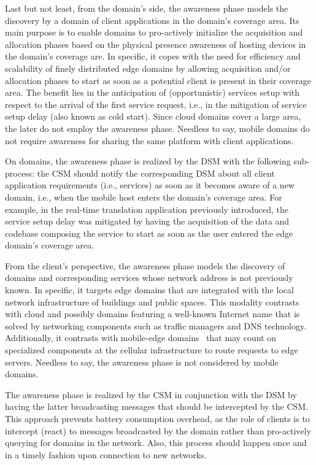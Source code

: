 Last but not least, from the domain's side, the awareness phase models the discovery by a domain of client applications in the domain's coverage area. Its main purpose is to enable domains to pro-actively initialize the acquisition and allocation phases based on the physical presence awareness of hosting devices in the domain's coverage are. In specific, it copes with the need for efficiency and scalability of finely distributed edge domains by allowing acquisition and/or allocation phases to start as soon as a potential client is present in their coverage area. The benefit lies in the anticipation of (opportunistic) services setup with respect to the arrival of the first service request, i.e., in the mitigation of service setup delay (also known as cold start). Since cloud domains cover a large area, the later do not employ the awareness phase. Needless to say, mobile domains do not require awareness for sharing the same platform with client applications.

On domains, the awareness phase is realized by the DSM with the following sub-process: the CSM should notify the corresponding DSM about all client application requirements (i.e., services) as soon as it becomes aware of a new domain, i.e., when the mobile host enters the domain's coverage area. For example, in the real-time translation application previously introduced, the service setup delay was mitigated by having the acquisition of the data and codebase composing the service to start as soon as the user entered the edge domain's coverage area.

From the client's perspective, the awareness phase models the discovery of domains and corresponding services whose network address is not previously known. In specific, it targets edge domains that are integrated with the local network infrastructure of buildings and public spaces. This modality contrasts with cloud and possibly domains featuring a well-known Internet name that is solved by networking components such as traffic managers and DNS technology. Additionally, it contrasts with mobile-edge domains~\cite{ahmed2016isco} that may count on specialized components at the cellular infrastructure to route requests to edge servers. Needless to say, the awareness phase is not considered by mobile domains.

The awareness phase is realized by the CSM in conjunction with the DSM by having the latter broadcasting messages that should be intercepted by the CSM. This approach prevents battery consumption overhead, as the role of clients is to intercept (react) to messages broadcasted by the domain rather than pro-actively querying for domains in the network. Also, this process should happen once and in a timely fashion upon connection to new networks. 

